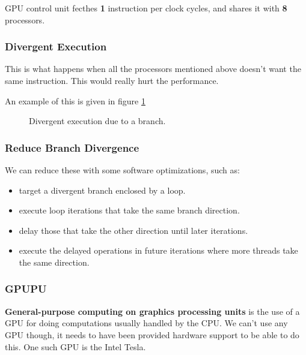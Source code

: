 GPU control unit fecthes \textbf{1} instruction per clock cycles, and shares it with \textbf{8} processors.

\subsubsection{Divergent Execution}
This is what happens when all the processors mentioned above doesn't want the same instruction. This would really hurt the performance.

An example of this is given in figure \ref{fig:divergent-execution}

\begin{figure}[H]
  \centering
  \caption{Divergent execution due to a branch.}
  \label{fig:divergent-execution}
\end{figure}

\subsubsection{Reduce Branch Divergence}
We can reduce these with some software optimizations, such as:
\begin{itemize}
  \item target a divergent branch enclosed by a loop.
  \item execute loop iterations that take the same branch direction.
  \item delay those that take the other direction until later iterations.
  \item execute the delayed operations in future iterations where more threads take the same direction.
\end{itemize}

\subsubsection{GPUPU}
\textbf{General-purpose computing on graphics processing units} is the use of a GPU for doing computations usually handled by the CPU. We can't use any GPU though, it needs to have been provided hardware support to be able to do this. One such GPU is the Intel Tesla.


